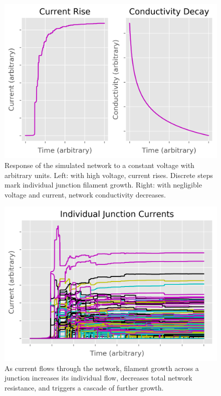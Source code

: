 \documentclass[twocolumn]{article}
\begin{document}
\begin{figure}[H]
\includegraphics[width=\columnwidth]{resources/simulation.png}
\caption{Response of the simulated network to a constant voltage with arbitrary units. Left: with high voltage, current rises. Discrete steps mark individual junction filament growth. Right: with negligible voltage and current, network conductivity decreases.}
\end{figure}

\begin{figure}[H]
\includegraphics[width=\columnwidth]{resources/simulation_individual.png}
\caption{As current flows through the network, filament growth across a junction increases its individual flow, decreases total network resistance, and triggers a cascade of further growth.}
\end{figure}
\end{document}
